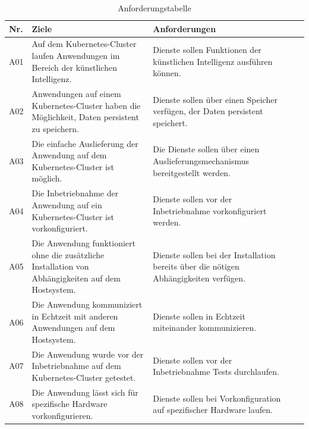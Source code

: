 \begin{table}[!htb]
\begin{center}

\begin{tabular}{|p{1cm}|p{6.8cm}|p{6.8cm}|l|l}
    \hline
    \textbf{Nr.} & \textbf{Ziele} & \textbf{Anforderungen} \\
    \hline
    \hypertarget{A01}{A01} 
    & Auf dem Kubernetes-Cluster laufen Anwendungen im Bereich der künstlichen Intelligenz.
    & Dienste sollen Funktionen der künstlichen Intelligenz ausführen können.
    \\
    \hline
    \hypertarget{A02}{A02}
    & Anwendungen auf einem Kubernetes-Cluster haben die Möglichkeit, Daten persistent zu speichern.
    & Dienste sollen über einen Speicher verfügen, der Daten persistent speichert.
    \\
    \hline
    \hypertarget{A03}{A03} 
    & Die einfache Auslieferung der Anwendung auf dem Kubernetes-Cluster ist möglich.
    & Die Dienste sollen über einen Auslieferungsmechanismus bereitgestellt werden.
    \\
    \hline
    \hypertarget{A04}{A04} 
    & Die Inbetriebnahme der Anwendung auf ein Kubernetes-Cluster ist vorkonfiguriert.
    & Dienste sollen vor der Inbetriebnahme vorkonfiguriert werden.
    \\
    \hline
    \hypertarget{A05}{A05} 
    & Die Anwendung funktioniert ohne die zusätzliche Installation von Abhängigkeiten auf dem Hostsystem.
    & Dienste sollen bei der Installation bereits über die nötigen Abhängigkeiten verfügen.
    \\
    \hline
    \hypertarget{A06}{A06} 
    & Die Anwendung kommuniziert in Echtzeit mit anderen Anwendungen auf dem Hostsystem.
    & Dienste sollen in Echtzeit miteinander kommunizieren.
    \\
    \hline
    \hypertarget{A07}{A07} 
    & Die Anwendung wurde vor der Inbetriebnahme auf dem Kubernetes-Cluster getestet.
    & Dienste sollen vor der Inbetriebnahme Tests durchlaufen.
    \\
    \hline
    \hypertarget{A08}{A08} 
    & Die Anwendung lässt sich für spezifische Hardware vorkonfigurieren. 
    & Dienste sollen bei Vorkonfiguration auf spezifischer Hardware laufen.
    \\
    \hline
\end{tabular}
\caption{Anforderungstabelle}
\label{table:Anforderungstabelle}
\end{center}
\end{table}

